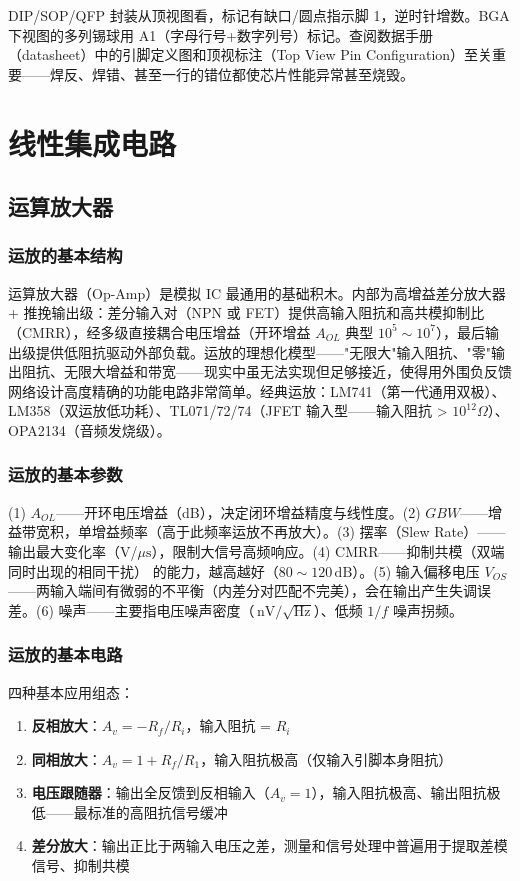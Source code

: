 \documentclass[12pt,UTF8]{ctexbook}
\begin{document}
DIP/SOP/QFP 封装从顶视图看，标记有缺口/圆点指示脚 1，逆时针增数。BGA 下视图的多列锡球用 A1（字母行号+数字列号）标记。查阅数据手册（datasheet）中的引脚定义图和顶视标注（Top View Pin Configuration）至关重要——焊反、焊错、甚至一行的错位都使芯片性能异常甚至烧毁。


\chapter{线性集成电路}
\label{chap:linear_ic}

\section{运算放大器}
\label{sec:op_amp}

\subsection{运放的基本结构}

运算放大器（Op-Amp）是模拟 IC 最通用的基础积木。内部为高增益差分放大器+ 推挽输出级：差分输入对（NPN 或 FET）提供高输入阻抗和高共模抑制比（CMRR），经多级直接耦合电压增益（开环增益 $A_{OL}$ 典型 $10^5\sim10^7$），最后输出级提供低阻抗驱动外部负载。运放的理想化模型——"无限大"输入阻抗、"零"输出阻抗、无限大增益和带宽——现实中虽无法实现但足够接近，使得用外围负反馈网络设计高度精确的功能电路非常简单。经典运放：LM741（第一代通用双极）、LM358（双运放低功耗）、TL071/72/74（JFET 输入型——输入阻抗 > $10^{12}\Omega$）、OPA2134（音频发烧级）。

\subsection{运放的基本参数}

(1) $A_{OL}$——开环电压增益（dB），决定闭环增益精度与线性度。(2) $GBW$——增益带宽积，单增益频率（高于此频率运放不再放大）。(3) 摆率（Slew Rate）——输出最大变化率（V/$\mu\mathrm{s}$），限制大信号高频响应。(4) CMRR——抑制共模（双端同时出现的相同干扰） 的能力，越高越好（$80\sim120\,\mathrm{dB}$）。(5) 输入偏移电压 $V_{OS}$——两输入端间有微弱的不平衡（内差分对匹配不完美），会在输出产生失调误差。(6) 噪声——主要指电压噪声密度（$\,\mathrm{nV/\sqrt{Hz}}$）、低频 $1/f$ 噪声拐频。

\subsection{运放的基本电路}

四种基本应用组态：
\begin{enumerate}
\item \textbf{反相放大}：$A_v = -R_f/R_i$，输入阻抗 = $R_i$
\item \textbf{同相放大}：$A_v = 1+R_f/R_1$，输入阻抗极高（仅输入引脚本身阻抗）
\item \textbf{电压跟随器}：输出全反馈到反相输入（$A_v=1$），输入阻抗极高、输出阻抗极低——最标准的高阻抗信号缓冲
\item \textbf{差分放大}：输出正比于两输入电压之差，测量和信号处理中普遍用于提取差模信号、抑制共模
\end{enumerate}
\end{document}
